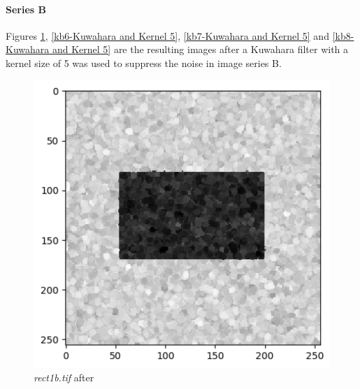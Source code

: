 \documentclass[runningheads]{llncs}
\begin{document}
\paragraph*{\textbf{Series B}}
Figures \ref{kb5-Kuwahara and Kernel 5}, \ref{kb6-Kuwahara and Kernel 5}, \ref{kb7-Kuwahara and Kernel 5} and \ref{kb8-Kuwahara and Kernel 5} are the resulting images after a Kuwahara filter with a kernel size of 5 was used to suppress the noise in image series B. 
\begin{figure}[h!]
\begin{minipage}[h]{0.47\linewidth}
\begin{center}
\includegraphics[width=1\linewidth]{Report/Result_Images/image_kb5.png} 
\caption{\emph{rect1b.tif} after}
\label{kb5-Kuwahara and Kernel 5}
\end{center} 
\end{minipage}
\hfill
\vspace{0.2 cm}
\begin{minipage}[h]{0.47\linewidth}
\begin{center}

\end{center}
\end{minipage}
\end{figure}
\end{document}
